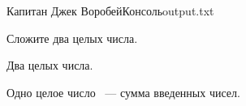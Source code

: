 \begin{problem}{1}{Капитан Джек Воробей}{Консоль}{output.txt}

Сложите два целых числа.
\InputFile

Два целых числа.

\OutputFile

Одно целое число ~--- сумма введенных чисел.

\Example

\begin{example}
%
\end{example}

\Code
{}


\end{problem}
